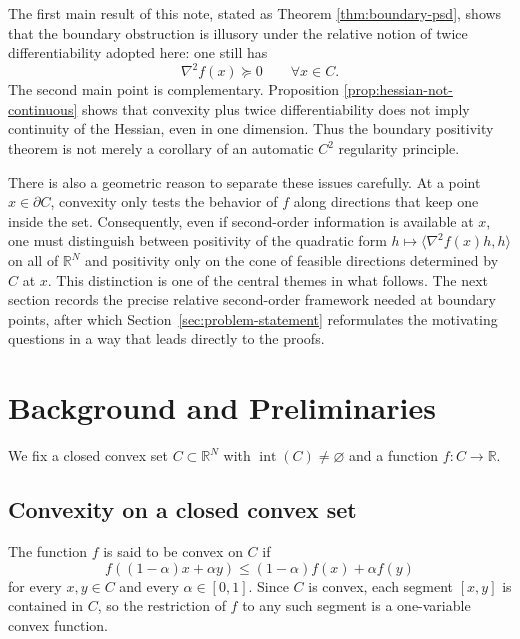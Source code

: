 \documentclass[reqno]{amsart}
\theoremstyle{definition}
\newcommand{\R}{\mathbb{R}}
\newcommand{\inner}[2]{\langle #1,#2\rangle}
\begin{document}
The first main result of this note, stated as Theorem
\ref{thm:boundary-psd}, shows that the boundary obstruction is illusory under
the relative notion of twice differentiability adopted here: one still has
\begin{equation}
    \nabla^2 f(x) \succeq 0 \qquad \forall x \in C.
\end{equation}
The second main point is complementary. Proposition
\ref{prop:hessian-not-continuous} shows that convexity plus twice
differentiability does not imply continuity of the Hessian, even in one
dimension. Thus the boundary positivity theorem is not merely a corollary of an
automatic $C^2$ regularity principle.

There is also a geometric reason to separate these issues carefully. At a point
$x \in \partial C$, convexity only tests the behavior of $f$ along directions
that keep one inside the set. Consequently, even if second-order information is
available at $x$, one must distinguish between positivity of the quadratic form
$h \mapsto \inner{\nabla^2 f(x) h}{h}$ on all of $\R^N$ and positivity only on
the cone of feasible directions determined by $C$ at $x$. This distinction is
one of the central themes in what follows. The next section records the precise
relative second-order framework needed at boundary points, after which
Section~\ref{sec:problem-statement} reformulates the motivating questions in a
way that leads directly to the proofs.

\section{Background and Preliminaries}\label{sec:preliminaries}

We fix a closed convex set $C \subset \R^N$ with $\operatorname{int}(C)
\neq \varnothing$ and a function $f \colon C \to \R$.

\subsection{Convexity on a closed convex set}

The function $f$ is said to be convex on $C$ if
\begin{equation}
    f((1-\alpha)x+\alpha y) \leq (1-\alpha)f(x)+\alpha f(y)
\end{equation}
for every $x,y \in C$ and every $\alpha \in [0,1]$. Since $C$ is convex, each
segment $[x,y]$ is contained in $C$, so the restriction of $f$ to any such
segment is a one-variable convex function.
\end{document}
